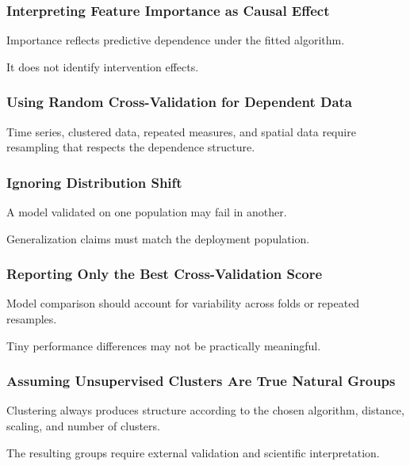 \subsubsection{Interpreting Feature Importance as Causal Effect}

Importance reflects predictive dependence under the fitted algorithm.

It does not identify intervention effects.

\subsubsection{Using Random Cross-Validation for Dependent Data}

Time series, clustered data, repeated measures, and spatial data require
resampling that respects the dependence structure.

\subsubsection{Ignoring Distribution Shift}

A model validated on one population may fail in another.

Generalization claims must match the deployment population.

\subsubsection{Reporting Only the Best Cross-Validation Score}

Model comparison should account for variability across folds or repeated
resamples.

Tiny performance differences may not be practically meaningful.

\subsubsection{Assuming Unsupervised Clusters Are True Natural Groups}

Clustering always produces structure according to the chosen algorithm,
distance, scaling, and number of clusters.

The resulting groups require external validation and scientific
interpretation.


